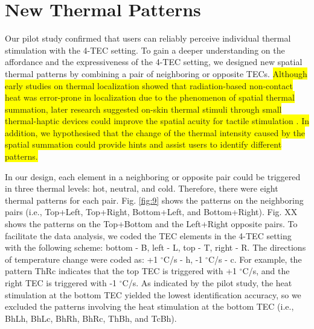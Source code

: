\documentclass[preprint,12pt]{elsarticle}
\begin{document}

\section{New Thermal Patterns}
Our pilot study confirmed that users can reliably perceive individual thermal stimulation with the 4-TEC setting. To gain a deeper understanding on the affordance and the expressiveness of the 4-TEC setting, we designed new spatial thermal patterns by combining a pair of neighboring or opposite TECs. \colorbox{yellow}{Although early studies \cite{26,27,31} on thermal localization showed that radiation-based non-contact heat was error-prone in localization due to the phenomenon of spatial thermal summation, later research suggested on-skin thermal stimuli through small thermal-haptic devices could improve the spatial acuity for tactile stimulation \cite{28}. In addition, we hypothesised that the change of the thermal intensity caused by the spatial summation could provide hints and assist users to identify different patterns.}

In our design, each element in a neighboring or opposite pair could be triggered in three thermal levels: hot, neutral, and cold. Therefore, there were eight thermal patterns for each pair. Fig. \ref{fig:9} shows the  patterns on the neighboring pairs (i.e., Top+Left, Top+Right, Bottom+Left, and Bottom+Right). Fig. XX shows the patterns on the Top+Bottom and the Left+Right opposite pairs. To facilitate the data analysis, we coded the TEC elements in the 4-TEC setting with the following scheme: bottom - B, left - L, top - T, right - R. The directions of temperature change were coded as: +1 $^{\circ}$C/s - h, -1 $^{\circ}$C/s - c. For example, the pattern ThRc indicates that the top TEC is triggered with +1 $^{\circ}$C/s, and the right TEC is triggered with -1 $^{\circ}$C/s. As indicated by the pilot study, the heat stimulation at the bottom TEC yielded the lowest identification accuracy, so we excluded the patterns involving the heat stimulation at the bottom TEC (i.e., BhLh, BhLc, BhRh, BhRc, ThBh, and TcBh).
\end{document}
